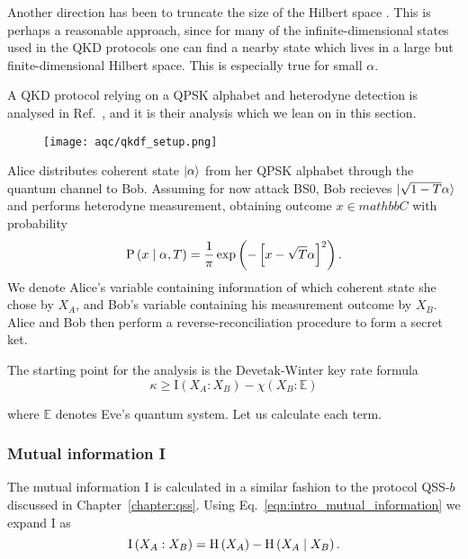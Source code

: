 
Another direction has been to truncate the size of the Hilbert space \cite{Ghorai2019, Lin2019, Papanastasiou2018}. This is perhaps a reasonable approach, since for many of the infinite-dimensional states used in the QKD protocols one can find a nearby state which lives in a large but finite-dimensional Hilbert space. This is especially true for small $\alpha$. 

A QKD protocol relying on a QPSK alphabet and heterodyne detection is analysed in Ref.~\cite{Papanastasiou2018}, and it is their analysis which we lean on in this section. 


\begin{figure}[htp]
\centering
\texttt{[image: aqc/qkdf\_setup.png]}
\caption{\label{fig:aqc_qkdf_setup}}
\end{figure}

Alice distributes coherent state $\ket{\alpha}$ from her QPSK alphabet through the quantum channel to Bob. Assuming for now attack BS$0$, Bob recieves $\ket{\sqrt{1-T}\alpha}$ and performs heterodyne measurement, obtaining outcome $x \in mathbb{C}$ with probability
\begin{equation}
\text{P}\left(x\; \middle| \; \alpha, T\right) = \frac{1}{\pi}\exp\left( - \left[ x - \sqrt{T}\alpha\right]^2\right).
\end{equation}
We denote Alice's variable containing information of which coherent state she chose by $X_A$, and Bob's variable containing his measurement outcome by $X_B$. Alice and Bob then perform a reverse-reconciliation procedure \cite{Grosshans2002, Grosshans2003, Laudenbach2017} to form a secret ket.

The starting point for the analysis is the Devetak-Winter key rate formula \cite{Devetak2004} 
\begin{equation}
\kappa \ge \text{I}\left(X_A : X_B\right) - \chi\left(X_B : \mathbb{E}\right)
\end{equation}

\noindent where $\mathbb{E}$ denotes Eve's quantum system. Let us calculate each term.

\subsubsection{Mutual information I}
The mutual information I is calculated in a similar fashion to the protocol QSS-$b$ discussed in Chapter~\ref{chapter:qss}. Using Eq.~\ref{eqn:intro_mutual_information} we expand $\text{I}$ as
\begin{equation}\label{eqn:qkdf_deriv_1}
\text{I}\left(X_A : X_B\right) = \text{H}\left(X_A\right) - \text{H}\left(X_A \; \middle| \; X_B\right).
\end{equation}

